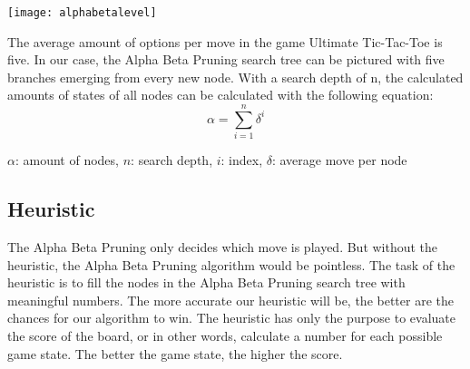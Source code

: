 \begin{fixedpic}
	\centering
	\texttt{[image: alphabetalevel]}
\end{fixedpic}

The average amount of options per move in the game Ultimate Tic-Tac-Toe is five. \cite{web:tsurel2013}
In our case, the Alpha Beta Pruning search tree can be pictured with five branches emerging from every new node. With a search depth of n, the calculated amounts of states of all nodes  can be calculated with the following  equation:  $$\alpha = \sum_{i=1}^{n} 	\delta^{i}$$

\begin{center}
$\alpha$: amount of nodes,
$n$: search depth,
$i$: index,
$\delta$: average move per node
\end{center}


\subsection{Heuristic}
The Alpha Beta Pruning only decides which move is played. But without the heuristic, the Alpha Beta Pruning algorithm would be pointless. The task of the heuristic is to fill the nodes in the Alpha Beta Pruning search tree with meaningful numbers. The more accurate our heuristic will be, the better are the chances for our algorithm to win. The heuristic has only the purpose to evaluate the score of the board, or in other words, calculate a number for each possible game state. The better the game state, the higher the score.

